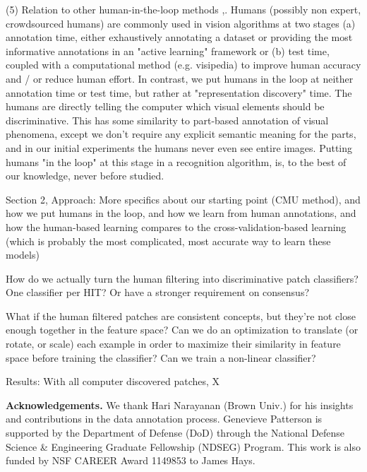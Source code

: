 \documentclass[10pt,twocolumn,letterpaper]{article}
\begin{document}
(5) Relation to other human-in-the-loop methods \cite{gingold2012micro, branson2010visual, kovashka2012whittlesearch},. Humans (possibly non expert, crowdsourced humans) are commonly used in vision algorithms at two stages (a) annotation time, either exhaustively annotating a dataset or providing the most informative annotations in an "active learning" framework or (b) test time, coupled with a computational method (e.g. visipedia) to improve human accuracy and / or reduce human effort. In contrast, we put humans in the loop at neither annotation time or test time, but rather at "representation discovery" time. The humans are directly telling the computer which visual elements should be discriminative. This has some similarity to part-based annotation of visual phenomena, except we don't require any explicit semantic meaning for the parts, and in our initial experiments the humans never even see entire images. Putting humans "in the loop" at this stage in a recognition algorithm, is, to the best of our knowledge, never before studied.

Section 2, Approach:
More specifics about our starting point (CMU method), and how we put humans in the loop, and how we learn from human annotations, and how the human-based learning compares to the cross-validation-based learning (which is probably the most complicated, most accurate way to learn these models)

How do we actually turn the human filtering into discriminative patch classifiers? One classifier per HIT? Or have a stronger requirement on consensus?

What if the human filtered patches are consistent concepts, but they're not close enough together in the feature space? Can we do an optimization to translate (or rotate, or scale) each example in order to maximize their similarity in feature space before training the classifier? Can we train a non-linear classifier?

Results:
With all computer discovered patches, X%


\textbf{Acknowledgements.} We thank Hari Narayanan (Brown Univ.) for his insights and contributions in the data annotation process. Genevieve Patterson is supported by the Department of Defense (DoD) through the National Defense Science \& Engineering Graduate Fellowship (NDSEG) Program. This work is also funded by NSF CAREER Award 1149853 to James Hays. 

{\small%


}
\end{document}
